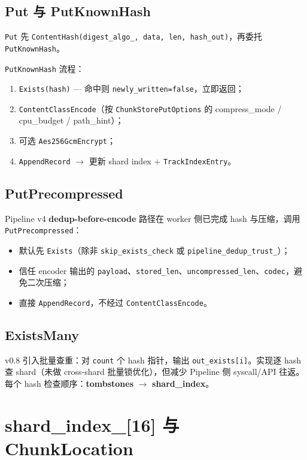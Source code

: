 \subsection{Put 与 PutKnownHash}

\texttt{Put} 先 \texttt{ContentHash(digest\_algo\_, data, len, hash\_out)}，再委托 \texttt{PutKnownHash}。

\texttt{PutKnownHash} 流程：
\begin{enumerate}[nosep]
  \item \texttt{Exists(hash)} — 命中则 \texttt{newly\_written=false}，立即返回；
  \item \texttt{ContentClassEncode}（按 \texttt{ChunkStorePutOptions} 的 compress\_mode / cpu\_budget / path\_hint）；
  \item 可选 \texttt{Aes256GcmEncrypt}；
  \item \texttt{AppendRecord} $\rightarrow$ 更新 shard index + \texttt{TrackIndexEntry}。
\end{enumerate}

\subsection{PutPrecompressed}

Pipeline v4 \textbf{dedup-before-encode} 路径在 worker 侧已完成 hash 与压缩，调用 \texttt{PutPrecompressed}：

\begin{itemize}
  \item 默认先 \texttt{Exists}（除非 \texttt{skip\_exists\_check} 或 \texttt{pipeline\_dedup\_trust\_}）；
  \item 信任 encoder 输出的 \texttt{payload}、\texttt{stored\_len}、\texttt{uncompressed\_len}、\texttt{codec}，避免二次压缩；
  \item 直接 \texttt{AppendRecord}，不经过 \texttt{ContentClassEncode}。
\end{itemize}

\subsection{ExistsMany}

v0.8 引入批量查重：对 \texttt{count} 个 hash 指针，输出 \texttt{out\_exists[i]}。实现逐 hash 查 shard（未做 cross-shard 批量锁优化），但减少 Pipeline 侧 syscall/API 往返。每个 hash 检查顺序：\textbf{tombstones} $\rightarrow$ \textbf{shard\_index}。

\section{shard\_index\_[16] 与 ChunkLocation}

